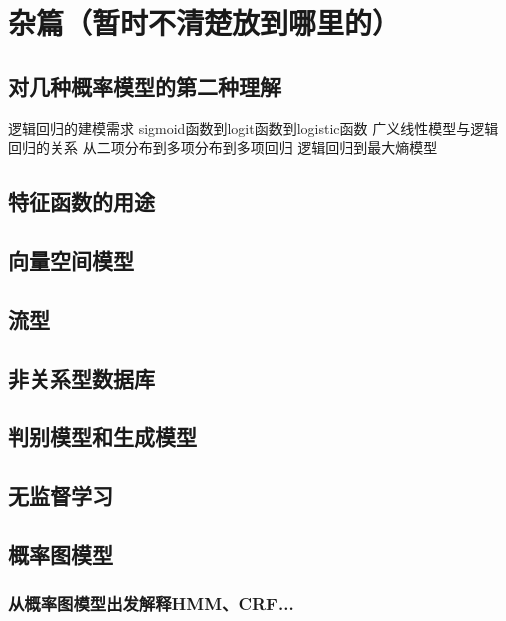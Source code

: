 \chapter{杂篇（暂时不清楚放到哪里的）}
    \section{对几种概率模型的第二种理解}
    逻辑回归的建模需求
    sigmoid函数到logit函数到logistic函数
    广义线性模型与逻辑回归的关系
    从二项分布到多项分布到多项回归
    逻辑回归到最大熵模型

    \section{特征函数的用途}
    \section{向量空间模型}
    \section{流型}
    \section{非关系型数据库}
    \section{判别模型和生成模型}
    \section{无监督学习}
    \section{概率图模型}
    \subsection{从概率图模型出发解释HMM、CRF...}
